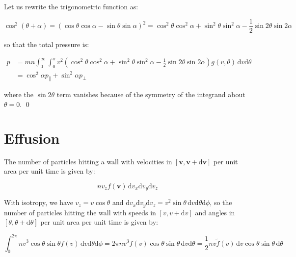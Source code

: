 \documentclass[12pt]{article}
\begin{document}
Let us rewrite the trigonometric function as:

\begin{equation}
    \cos^{2}{(\theta + \alpha)} = \left( \cos{\theta} \cos{\alpha} - \sin{\theta} \sin{\alpha} \right)^{2} = \cos^{2}{\theta} \cos^{2}{\alpha} + \sin^{2}{\theta} \sin^{2}{\alpha} - \frac{1}{2} \sin{2\theta} \sin{2\alpha}
\end{equation}

so that the total pressure is:

\begin{equation}
\begin{split}
    p &= mn \int_{0}^{\infty} \int_{0}^{\pi} v^{2} \left( \cos^{2}{\theta} \cos^{2}{\alpha} + \sin^{2}{\theta} \sin^{2}{\alpha} - \frac{1}{2} \sin{2\theta} \sin{2\alpha} \right) g(v, \theta) \, \mathrm{d}v \mathrm{d}\theta \\
    &= \cos^{2}\alpha p_{\parallel} + \sin^{2}\alpha p_{\perp}
\end{split}
\end{equation}

where the $\sin{2\theta}$ term vanishes because of the symmetry of the integrand about $\theta = 0$.
\qed


\pagebreak
\section*{Effusion}



The number of particles hitting a wall with velocities in $[\mathbf{v}, \mathbf{v} + \mathrm{d}\mathbf{v}]$ per unit area per unit time is given by:

\begin{equation}
    nv_{z} f(\mathbf{v}) \, \mathrm{d}v_{x} \mathrm{d}v_{y} \mathrm{d}v_{z}
\end{equation}

With isotropy, we have $v_{z} = v\cos{\theta}$ and $\mathrm{d}v_{x} \mathrm{d}v_{y} \mathrm{d}v_{z} = v^{2} \sin{\theta} \, \mathrm{d}v \mathrm{d}\theta \mathrm{d}\phi$, so the number of particles hitting the wall with speeds in $[v, v + \mathrm{d}v]$ and angles in $[\theta, \theta + \mathrm{d}\theta]$ per unit area per unit time is given by:

\begin{equation}
    \int_{0}^{2\pi} nv^{3} \cos{\theta} \sin{\theta} f(v) \, \mathrm{d}v \mathrm{d}\theta \mathrm{d}\phi = 2\pi nv^{3} f(v) \cos{\theta} \sin{\theta} \, \mathrm{d}v \mathrm{d}\theta = \frac{1}{2} nv \tilde{f}(v) \, \mathrm{d}v \cos{\theta} \sin{\theta} \, \mathrm{d}\theta
\end{equation}
\end{document}
